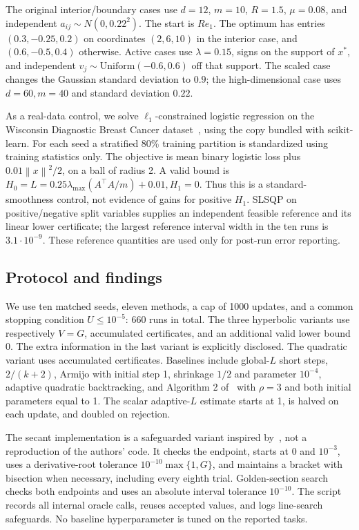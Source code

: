 \documentclass[11pt]{article}
\newcommand{\norm}[1]{\left\|#1\right\|}
\begin{document}
The original interior/boundary cases use $d=12$, $m=10$, $R=1.5$,
$\mu=0.08$, and independent $a_{ij}\sim N(0,0.22^2)$.
The start is $Re_1$. The optimum has entries $(0.3,-0.25,0.2)$ on
coordinates $(2,6,10)$ in the interior case, and $(0.6,-0.5,0.4)$ otherwise.
Active cases use $\lambda=0.15$, signs on the support of $x^*$, and
independent $v_j\sim\mathrm{Uniform}(-0.6,0.6)$ off that support.
The scaled case changes the Gaussian standard deviation to $0.9$;
the high-dimensional case uses $d=60,m=40$ and standard deviation $0.22$.

As a real-data control, we solve $\ell_1$-constrained logistic regression
on the Wisconsin Diagnostic Breast Cancer dataset~\cite{wdbc}, using the
copy bundled with scikit-learn. For each seed a stratified 80\% training
partition is standardized using training statistics only. The objective is
mean binary logistic loss plus $0.01\norm x^2/2$, on a ball of radius 2.
A valid bound is $H_0=L=0.25\lambda_{\max}(A^\top A/m)+0.01,H_1=0$.
Thus this is a standard-smoothness control, not evidence of gains for
positive $H_1$. SLSQP on positive/negative split variables supplies an
independent feasible reference and its linear lower certificate; the
largest reference interval width in the ten runs is $3.1\cdot10^{-9}$.
These reference quantities are used only for post-run error reporting.

\subsection{Protocol and findings}
We use ten matched seeds, eleven methods, a cap of 1000 updates, and a
common stopping condition $U\le10^{-5}$: 660 runs in total. The three
hyperbolic variants use respectively $V=G$, accumulated certificates, and
an additional valid lower bound 0. The extra information in the last
variant is explicitly disclosed. The quadratic variant uses accumulated
certificates. Baselines include global-$L$ short steps, $2/(k+2)$, Armijo
with initial step 1, shrinkage $1/2$ and parameter $10^{-4}$, adaptive
quadratic backtracking, and Algorithm 2 of~\cite{vyguzov} with $\rho=3$
and both initial parameters equal to 1. The scalar adaptive-$L$ estimate
starts at 1, is halved on each update, and doubled on rejection.

The secant implementation is a safeguarded variant inspired by~\cite{hendrych},
not a reproduction of the authors' code. It checks the endpoint, starts
at 0 and $10^{-3}$, uses a derivative-root tolerance
$10^{-10}\max\{1,G\}$, and maintains a bracket with bisection when
necessary, including every eighth trial. Golden-section search checks
both endpoints and uses an absolute interval tolerance $10^{-10}$.
The script records all internal oracle calls, reuses accepted values,
and logs line-search safeguards. No baseline hyperparameter is tuned
on the reported tasks.
\end{document}
